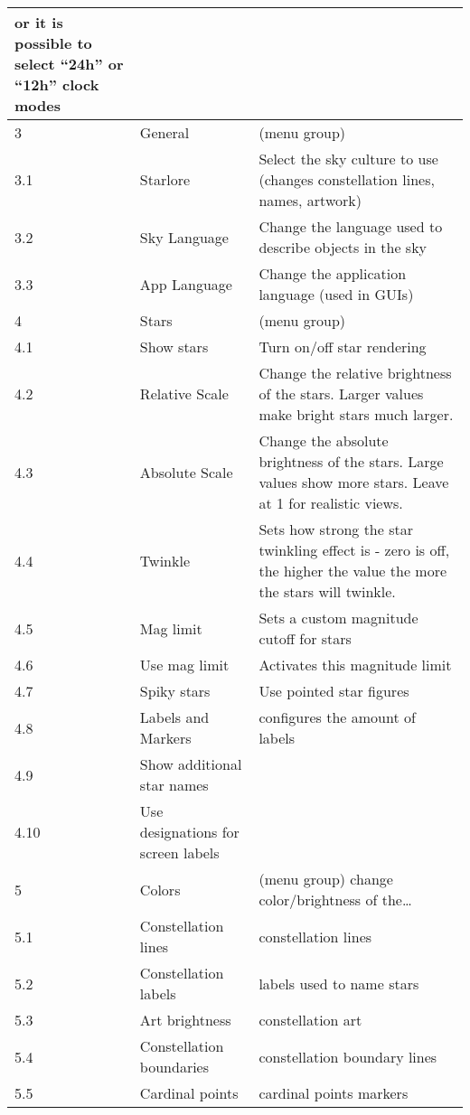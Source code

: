 \begin{longtable}{l|p{45mm}|p{85mm}}
                            or it is possible to select ``24h'' or ``12h'' clock modes\\\midrule
3    & General      & (menu group)\\%
3.1  & Starlore     & Select the sky culture to use (changes constellation lines, names, artwork)\\%
3.2  & Sky Language & Change the language used to describe objects in the sky\\%
3.3  & App Language & Change the application language (used in GUIs) \\\midrule
4    & Stars          & (menu group)\\%
4.1  & Show stars     & Turn on/off star rendering\\%
4.2  & Relative Scale & Change the relative brightness of the stars. Larger values make bright stars much larger.\\%
4.3  & Absolute Scale & Change the absolute brightness of the stars. Large values show more stars. Leave at 1 for realistic views. \\%
4.4  & Twinkle        & Sets how strong the star twinkling effect is - zero is off, the higher the value the more the stars will twinkle.\\%
4.5  & Mag limit      & Sets a custom magnitude cutoff for stars\\
4.6  & Use mag limit  & Activates this magnitude limit \\
4.7  & Spiky stars    & Use pointed star figures \\
4.8  & Labels and Markers & configures the amount of labels \\
4.9  & Show additional star names  & \\
4.10 & Use designations for screen labels & \\\midrule
5    & Colors                      & (menu group) change color/brightness of the\ldots\\%
5.1  & Constellation lines         & constellation lines\\%
5.2  & Constellation labels        & labels used to name stars\\%
5.3  & Art brightness              & constellation art\\%
5.4  & Constellation boundaries    & constellation boundary lines\\%
5.5  & Cardinal points             & cardinal points markers\\%

\end{longtable}
